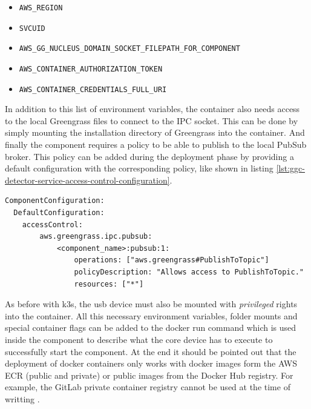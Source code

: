 \begin{itemize}
    \item \texttt{AWS\_REGION}
    \item \texttt{SVCUID}
    \item \texttt{AWS\_GG\_NUCLEUS\_DOMAIN\_SOCKET\_FILEPATH\_FOR\_COMPONENT}
    \item \texttt{AWS\_CONTAINER\_AUTHORIZATION\_TOKEN}
    \item \texttt{AWS\_CONTAINER\_CREDENTIALS\_FULL\_URI}
\end{itemize}

In addition to this list of environment variables, the container also needs access to the local Greengrass files to connect to the \gls{IPC} socket. This can be done by simply mounting the installation directory of Greengrass into the container. And finally the component requires a policy to be able to publish to the local PubSub broker. This policy can be added during the deployment phase by providing a default configuration with the corresponding policy, like shown in listing \ref{lst:ggc-detector-service-access-control-configuration}.

\begin{lstlisting}[caption={Access control configuration for publishing to IPC.},label={lst:ggc-detector-service-access-control-configuration},captionpos=b]
ComponentConfiguration:
  DefaultConfiguration:
    accessControl:
        aws.greengrass.ipc.pubsub:
            <component_name>:pubsub:1:
                operations: ["aws.greengrass#PublishToTopic"]
                policyDescription: "Allows access to PublishToTopic."
                resources: ["*"]
\end{lstlisting}

As before with k3s, the \gls{usb} device must also be mounted with \textit{privileged} rights into the container. All this necessary environment variables, folder mounts and special container flags can be added to the docker run command which is used inside the component to describe what the core device has to execute to successfully start the component. At the end it should be pointed out that the deployment of docker containers only works with docker images form the \gls{AWS} \gls{ECR} (public and private) or public images from the Docker Hub registry. For example, the GitLab private container registry cannot be used at the time of writting \cite{AmazonWebServicesDockerContainer}.


